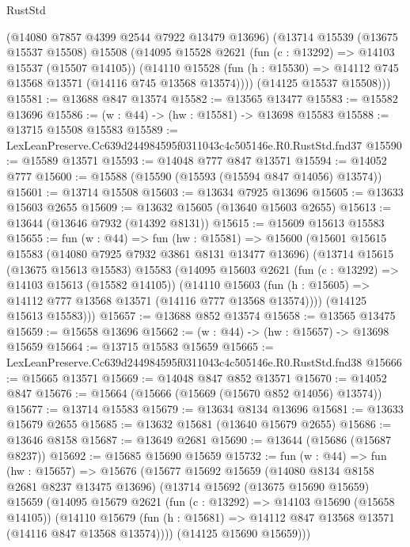 \begin{lexlean}{RustStd}
\begin{coremodule}
      (@14080 @7857 @4399 @2544 @7922 @13479 @13696)
      (@13714
        @15539
        (@13675 @15537 @15508)
        @15508
        (@14095
          @15528
          @2621
          (fun (c : @13292) => @14103 @15537 (@15507 @14105))
          (@14110
            @15528
            (fun (h : @15530) => @14112 @745 @13568 @13571 (@14116 @745 @13568 @13574))))
        (@14125 @15537 @15508)))
@15581 := @13688 @847 @13574
@15582 := @13565 @13477
@15583 := @15582 @13696
@15586 := (w : @44) -> (hw : @15581) -> @13698 @15583
@15588 := @13715 @15508 @15583
@15589 := LexLeanPreserve.Cc639d244984595f0311043c4c505146e.R0.RustStd.fnd37
@15590 := @15589 @13571
@15593 := @14048 @777 @847 @13571
@15594 := @14052 @777
@15600 := @15588 (@15590 (@15593 (@15594 @847 @14056) @13574))
@15601 := @13714 @15508
@15603 := @13634 @7925 @13696
@15605 := @13633 @15603 @2655
@15609 := @13632 @15605 (@13640 @15603 @2655)
@15613 := @13644 (@13646 @7932 (@14392 @8131))
@15615 := @15609 @15613 @15583
@15655 := fun (w : @44) =>
  fun (hw : @15581) =>
  @15600
    (@15601
      @15615
      @15583
      (@14080 @7925 @7932 @3861 @8131 @13477 @13696)
      (@13714
        @15615
        (@13675 @15613 @15583)
        @15583
        (@14095
          @15603
          @2621
          (fun (c : @13292) => @14103 @15613 (@15582 @14105))
          (@14110
            @15603
            (fun (h : @15605) => @14112 @777 @13568 @13571 (@14116 @777 @13568 @13574))))
        (@14125 @15613 @15583)))
@15657 := @13688 @852 @13574
@15658 := @13565 @13475
@15659 := @15658 @13696
@15662 := (w : @44) -> (hw : @15657) -> @13698 @15659
@15664 := @13715 @15583 @15659
@15665 := LexLeanPreserve.Cc639d244984595f0311043c4c505146e.R0.RustStd.fnd38
@15666 := @15665 @13571
@15669 := @14048 @847 @852 @13571
@15670 := @14052 @847
@15676 := @15664 (@15666 (@15669 (@15670 @852 @14056) @13574))
@15677 := @13714 @15583
@15679 := @13634 @8134 @13696
@15681 := @13633 @15679 @2655
@15685 := @13632 @15681 (@13640 @15679 @2655)
@15686 := @13646 @8158
@15687 := @13649 @2681
@15690 := @13644 (@15686 (@15687 @8237))
@15692 := @15685 @15690 @15659
@15732 := fun (w : @44) =>
  fun (hw : @15657) =>
  @15676
    (@15677
      @15692
      @15659
      (@14080 @8134 @8158 @2681 @8237 @13475 @13696)
      (@13714
        @15692
        (@13675 @15690 @15659)
        @15659
        (@14095
          @15679
          @2621
          (fun (c : @13292) => @14103 @15690 (@15658 @14105))
          (@14110
            @15679
            (fun (h : @15681) => @14112 @847 @13568 @13571 (@14116 @847 @13568 @13574))))
        (@14125 @15690 @15659)))

\end{coremodule}
\end{lexlean}
